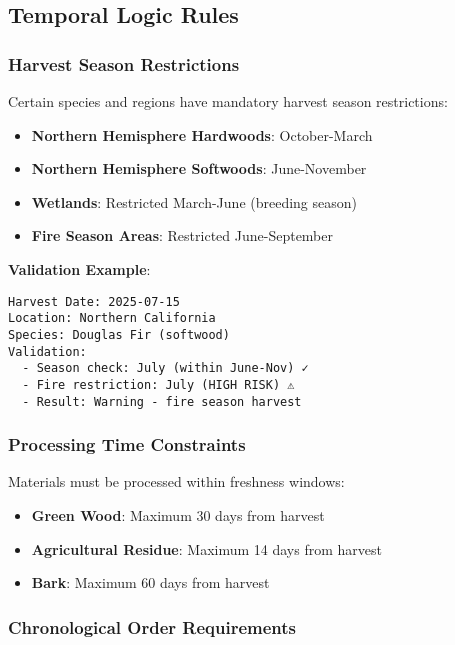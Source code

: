 \subsection{Temporal Logic Rules}
\label{sec:temporal-logic}

\subsubsection{Harvest Season Restrictions}

Certain species and regions have mandatory harvest season restrictions:

\begin{itemize}
    \item \textbf{Northern Hemisphere Hardwoods}: October-March
    \item \textbf{Northern Hemisphere Softwoods}: June-November  
    \item \textbf{Wetlands}: Restricted March-June (breeding season)
    \item \textbf{Fire Season Areas}: Restricted June-September
\end{itemize}

\textbf{Validation Example}:
\begin{verbatim}
Harvest Date: 2025-07-15
Location: Northern California
Species: Douglas Fir (softwood)
Validation:
  - Season check: July (within June-Nov) ✓
  - Fire restriction: July (HIGH RISK) ⚠
  - Result: Warning - fire season harvest
\end{verbatim}

\subsubsection{Processing Time Constraints}

Materials must be processed within freshness windows:

\begin{itemize}
    \item \textbf{Green Wood}: Maximum 30 days from harvest
    \item \textbf{Agricultural Residue}: Maximum 14 days from harvest
    \item \textbf{Bark}: Maximum 60 days from harvest
\end{itemize}

\subsubsection{Chronological Order Requirements}

